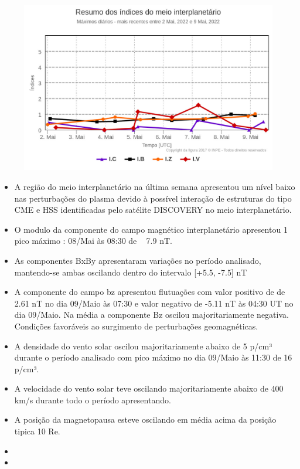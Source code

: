 \documentclass[11pt, oneside]{article}
\begin{document}
 \begin{figure}[H]
    \centering
    \includegraphics[width=14cm]{./figures//figureMIIndex.png}
\end{figure}
 \begin{itemize}
 \item A região do meio interplanetário na última  semana apresentou um nível  baixo nas perturbações  do plasma devido à possível interação de estruturas do tipo CME e HSS identificadas pelo satélite DISCOVERY no meio interplanetário.
\item O modulo da componente do campo magnético interplanetário apresentou 1 pico máximo : 08/Mai às 08:30  de ~ 7.9 nT. 
\item As componentes BxBy apresentaram variações no período analisado, mantendo-se ambas oscilando dentro do intervalo [+5.5, -7.5] nT  
\item A componente do campo bz apresentou flutuações com valor positivo de de 2.61 nT no dia 09/Maio às 07:30 e valor negativo de -5.11 nT às 04:30 UT no dia 09/Maio.  Na média  a componente Bz  oscilou majoritariamente negativa. Condições favoráveis ao surgimento de perturbações geomagnéticas.
\item A densidade do vento solar oscilou majoritariamente abaixo de 5 p/cm³ durante o período analisado com pico máximo no dia 09/Maio às 11:30 de 16 p/cm³. 
\item A velocidade do vento solar teve oscilando majoritariamente abaixo de 400 km/s durante todo o período apresentando.
\item A posição da magnetopausa esteve oscilando em média  acima da posição tipica 10 Re.
\item   
\item  
\end{itemize} 
\end{document}
